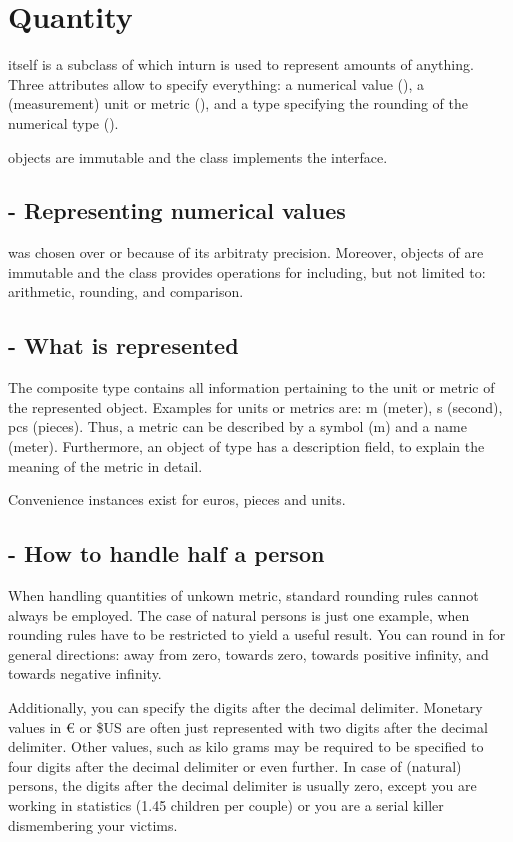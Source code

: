 \section{Quantity}
 itself is a subclass of  which inturn is used to represent amounts of anything.
Three attributes allow  to specify everything: a numerical value (), a (measurement) unit or metric (), and a type specifying the rounding of the numerical type ().

 objects are immutable and the class implements the  interface.

\subsection{ - Representing numerical values}
 was chosen over  or  because of its arbitraty precision.
Moreover, objects of  are immutable and the  class provides operations for including, but not limited to: arithmetic, rounding, and comparison.

\subsection{ - What is represented}
The composite type  contains all information pertaining to the unit or metric of the represented object.
Examples for units or metrics are: m (meter), s (second), pcs (pieces).
Thus, a metric can be described by a symbol (m) and a name (meter).
Furthermore, an object of type  has a description field, to explain the meaning of the metric in detail.

Convenience instances exist for euros, pieces and units.

\subsection{ - How to handle half a person}
When handling quantities of unkown metric, standard rounding rules cannot always be employed.
The case of natural persons is just one example, when rounding rules have to be restricted to yield a useful result.
You can round in for general directions: away from zero, towards zero, towards positive infinity, and towards negative infinity.

Additionally, you can specify the digits after the decimal delimiter.
Monetary values in \euro{} or \$US are often just represented with two digits after the decimal delimiter.
Other values, such as kilo grams may be required to be specified to four digits after the decimal delimiter or even further.
In case of (natural) persons, the digits after the decimal delimiter is usually zero, except you are working in statistics (1.45 children per couple) or you are a serial killer dismembering your victims.

